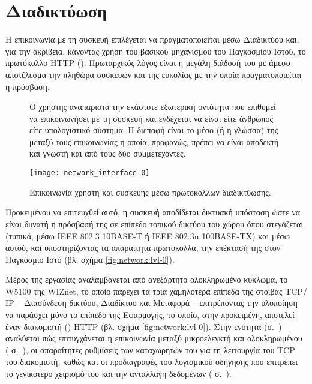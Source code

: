 \chapter{Διαδικτύωση}
\label{ch:network}

Η επικοινωνία με τη συσκευή επιλέγεται να πραγματοποιείται μέσω Διαδικτύου και,
για την ακρίβεια, κάνοντας χρήση του βασικού μηχανισμού του Παγκοσμίου Ιστού, το
πρωτόκολλο HTTP (). Πρωταρχικός λόγος είναι η
μεγάλη διάδοσή του με άμεσο αποτέλεσμα την πληθώρα συσκευών και της ευκολίας με
την οποία πραγματοποιείται η πρόσβαση.

\begin{figure}
    \caption{Επικοινωνία χρήστη και συσκευής μέσω πρωτοκόλλων διαδικτύωσης.
    \label{fig:network:interface-0}}
    Ο χρήστης αναπαριστά την εκάστοτε εξωτερική οντότητα που επιθυμεί να
    επικοινωνήσει με τη συσκευή και ενδέχεται να είναι είτε άνθρωπος είτε
    υπολογιστικό σύστημα. Η διεπαφή είναι το μέσο (ή η γλώσσα) της μεταξύ τους
    επικοινωνίας η οποία, προφανώς, πρέπει να είναι αποδεκτή και γνωστή και από
    τους δύο συμμετέχοντες.

    \begin{center}
    \texttt{[image: network\_interface-0]}
    \end{center}
\end{figure}

Προκειμένου να επιτευχθεί αυτό, η συσκευή αποδίδεται δικτυακή υπόσταση ώστε να
είναι δυνατή η πρόσβασή της σε επίπεδο τοπικού δικτύου του χώρου όπου στεγάζεται
(τυπικά, μέσω IEEE 802.3 10BASE-T ή IEEE 802.3u 100BASE-TX) και μέσω αυτού, και
υποστηρίζοντας τα απαραίτητα πρωτόκολλα, την επέκτασή της στον Παγκόσμιο Ιστό
(βλ. σχήμα \ref{fig:network:lvl-0}).

Μέρος της εργασίας αναλαμβάνεται από ανεξάρτητο ολοκληρωμένο κύκλωμα, το W5100
της WIZnet, το οποίο παρέχει τα τρία χαμηλότερα επίπεδα της στοίβας TCP\slash{}%
IP -- Διασύνδεση δικτύου, Διαδίκτυο και Μεταφορά -- επιτρέποντας την υλοποίηση
να παράσχει μόνο το επίπεδο της Εφαρμογής, το οποίο, στην προκειμένη, αποτελεί
έναν διακομιστή () HTTP (βλ. σχήμα \ref{fig:network:lvl-0}). Στην
ενότητα  (σ.~\pageref{sec:w5100}) αναλύεται πώς επιτυγχάνεται
η επικοινωνία μεταξύ μικροελεγκτή και ολοκληρωμένου
( σ.~\pageref{subsec:network:interface}), οι
απαραίτητες ρυθμίσεις των καταχωρητών του για τη λειτουργία του TCP 
του διακομιστή, καθώς και οι προδιαγραφές του λογισμικού οδήγησης που επιτρέπει
το γενικότερο χειρισμό του και την ανταλλαγή δεδομένων
( σ.~\pageref{subsec:network:register}).

